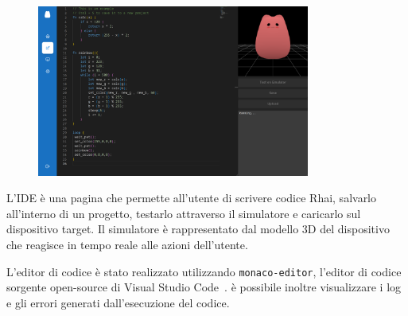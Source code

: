\begin{figure}[H]
    \centering
    \includegraphics[width=0.8\textwidth]{images/chapter7/ide.png}
    \label{fig:ide}
  \end{figure}

L'IDE è una pagina che permette all'utente di scrivere codice Rhai, salvarlo all'interno 
di un progetto, testarlo attraverso il simulatore e caricarlo sul dispositivo target.
Il simulatore è rappresentato dal modello 3D del dispositivo che reagisce in tempo reale
alle azioni dell'utente.

L'editor di codice è stato realizzato utilizzando \texttt{monaco-editor}, l'editor di codice sorgente open-source di Visual Studio Code~\cite{monaco-editor}.
è possibile inoltre visualizzare i log e gli errori generati dall'esecuzione del codice.